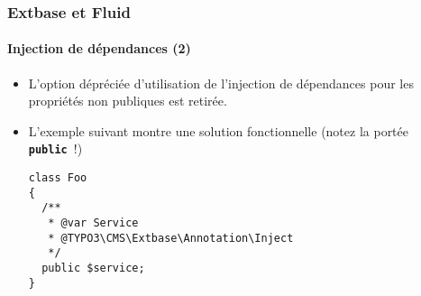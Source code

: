 %

\begin{frame}[fragile]
	\frametitle{Extbase et Fluid}
	\framesubtitle{Injection de dépendances (2)}


	\begin{itemize}
		\item L'option dépréciée d'utilisation de l'injection de dépendances
			pour les propriétés non publiques est retirée.
		\item L'exemple suivant montre une solution fonctionnelle\newline
			\small(notez la portée \texttt{\textbf{public}}~!)\normalsize
\begin{lstlisting}
class Foo
{
  /**
   * @var Service
   * @TYPO3\CMS\Extbase\Annotation\Inject
   */
  public $service;
}
\end{lstlisting}

	\end{itemize}

\end{frame}

